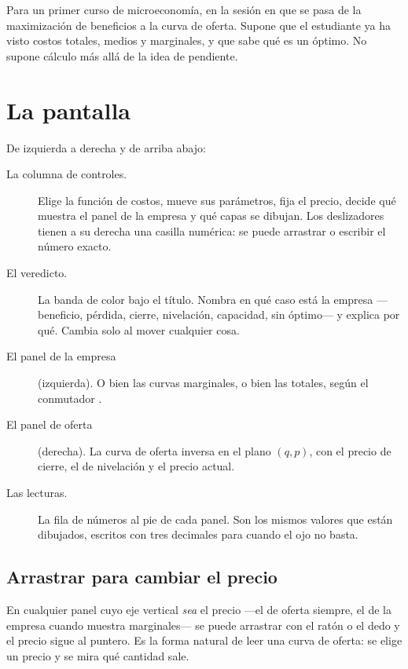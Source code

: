 \documentclass[11pt,a4paper]{appletmanual}
\begin{document}
Para un primer curso de microeconomía, en la sesión en que se pasa de la
maximización de beneficios a la curva de oferta. Supone que el estudiante ya ha
visto costos totales, medios y marginales, y que sabe qué es un óptimo. No
supone cálculo más allá de la idea de pendiente.



\section{La pantalla}


De izquierda a derecha y de arriba abajo:

\begin{description}
\item[La columna de controles.] Elige la función de costos, mueve sus
  parámetros, fija el precio, decide qué muestra el panel de la empresa y qué
  capas se dibujan. Los deslizadores tienen a su derecha una casilla numérica:
  se puede arrastrar o escribir el número exacto.
\item[El veredicto.] La banda de color bajo el título. Nombra en qué caso está
  la empresa —beneficio, pérdida, cierre, nivelación, capacidad, sin óptimo— y
  explica por qué. Cambia solo al mover cualquier cosa.
\item[El panel de la empresa] (izquierda). O bien las curvas marginales, o bien
  las totales, según el conmutador .
\item[El panel de oferta] (derecha). La curva de oferta inversa en el plano
  $(q, p)$, con el precio de cierre, el de nivelación y el precio actual.
\item[Las lecturas.] La fila de números al pie de cada panel. Son los mismos
  valores que están dibujados, escritos con tres decimales para cuando el ojo
  no basta.
\end{description}

\subsection{Arrastrar para cambiar el precio}

En cualquier panel cuyo eje vertical \emph{sea} el precio —el de oferta
siempre, el de la empresa cuando muestra marginales— se puede arrastrar con el
ratón o el dedo y el precio sigue al puntero. Es la forma natural de leer una
curva de oferta: se elige un precio y se mira qué cantidad sale.
\end{document}
